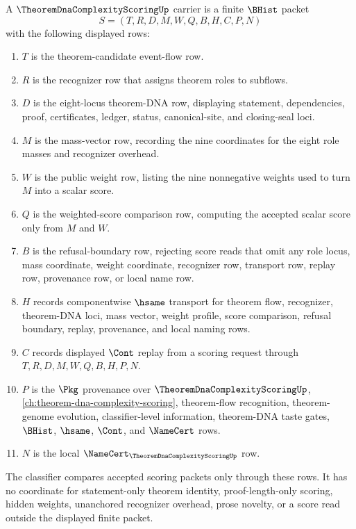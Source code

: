 \begin{definition}
\label{def:theorem-dna-complexity-scoring-carrier}
A $\TheoremDnaComplexityScoringUp$ carrier is a finite $\BHist$ packet
$$
S=(T,R,D,M,W,Q,B,H,C,P,N)
$$
with the following displayed rows:
\begin{enumerate}
\item $T$ is the theorem-candidate event-flow row.
\item $R$ is the recognizer row that assigns theorem roles to subflows.
\item $D$ is the eight-locus theorem-DNA row, displaying statement, dependencies, proof, certificates, ledger, status, canonical-site, and closing-seal loci.
\item $M$ is the mass-vector row, recording the nine coordinates for the eight role masses and recognizer overhead.
\item $W$ is the public weight row, listing the nine nonnegative weights used to turn $M$ into a scalar score.
\item $Q$ is the weighted-score comparison row, computing the accepted scalar score only from $M$ and $W$.
\item $B$ is the refusal-boundary row, rejecting score reads that omit any role locus, mass coordinate, weight coordinate, recognizer row, transport row, replay row, provenance row, or local name row.
\item $H$ records componentwise $\hsame$ transport for theorem flow, recognizer, theorem-DNA loci, mass vector, weight profile, score comparison, refusal boundary, replay, provenance, and local naming rows.
\item $C$ records displayed $\Cont$ replay from a scoring request through $T,R,D,M,W,Q,B,H,P,N$.
\item $P$ is the $\Pkg$ provenance over $\TheoremDnaComplexityScoringUp$, \autoref{ch:theorem-dna-complexity-scoring}, theorem-flow recognition, theorem-genome evolution, classifier-level information, theorem-DNA taste gates, $\BHist$, $\hsame$, $\Cont$, and $\NameCert$ rows.
\item $N$ is the local $\NameCert_{\TheoremDnaComplexityScoringUp}$ row.
\end{enumerate}
The classifier compares accepted scoring packets only through these rows. It has no coordinate for statement-only theorem identity, proof-length-only scoring, hidden weights, unanchored recognizer overhead, prose novelty, or a score read outside the displayed finite packet.
\end{definition}


